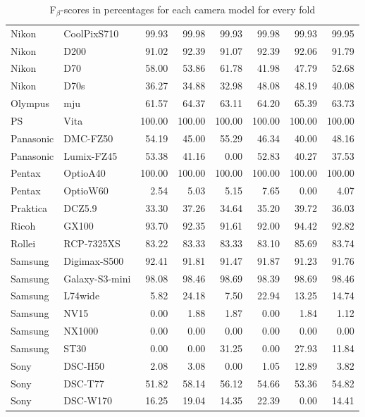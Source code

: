 \begin{table}[h]
{\begin{tabular}{|l|l|r|r|r|r|r|r|}
Nikon & CoolPixS710 & 99.93 & 99.98 & 99.93 & 99.98 & 99.93 & 99.95\\
Nikon & D200 & 91.02 & 92.39 & 91.07 & 92.39 & 92.06 & 91.79\\
Nikon & D70 & 58.00 & 53.86 & 61.78 & 41.98 & 47.79 & 52.68\\
Nikon & D70s & 36.27 & 34.88 & 32.98 & 48.08 & 48.19 & 40.08\\
Olympus & mju & 61.57 & 64.37 & 63.11 & 64.20 & 65.39 & 63.73\\
PS & Vita & 100.00 & 100.00 & 100.00 & 100.00 & 100.00 & 100.00\\
Panasonic & DMC-FZ50 & 54.19 & 45.00 & 55.29 & 46.34 & 40.00 & 48.16\\
Panasonic & Lumix-FZ45 & 53.38 & 41.16 & 0.00 & 52.83 & 40.27 & 37.53\\
Pentax & OptioA40 & 100.00 & 100.00 & 100.00 & 100.00 & 100.00 & 100.00\\
Pentax & OptioW60 & 2.54 & 5.03 & 5.15 & 7.65 & 0.00 & 4.07\\
Praktica & DCZ5.9 & 33.30 & 37.26 & 34.64 & 35.20 & 39.72 & 36.03\\
Ricoh & GX100 & 93.70 & 92.35 & 91.61 & 92.00 & 94.42 & 92.82\\
Rollei & RCP-7325XS & 83.22 & 83.33 & 83.33 & 83.10 & 85.69 & 83.74\\
Samsung & Digimax-S500 & 92.41 & 91.81 & 91.47 & 91.87 & 91.23 & 91.76\\
Samsung & Galaxy-S3-mini & 98.08 & 98.46 & 98.69 & 98.39 & 98.69 & 98.46\\
Samsung & L74wide & 5.82 & 24.18 & 7.50 & 22.94 & 13.25 & 14.74\\
Samsung & NV15 & 0.00 & 1.88 & 1.87 & 0.00 & 1.84 & 1.12\\
Samsung & NX1000 & 0.00 & 0.00 & 0.00 & 0.00 & 0.00 & 0.00\\
Samsung & ST30 & 0.00 & 0.00 & 31.25 & 0.00 & 27.93 & 11.84\\
Sony & DSC-H50 & 2.08 & 3.08 & 0.00 & 1.05 & 12.89 & 3.82\\
Sony & DSC-T77 & 51.82 & 58.14 & 56.12 & 54.66 & 53.36 & 54.82\\
Sony & DSC-W170 & 16.25 & 19.04 & 14.35 & 22.39 & 0.00 & 14.41\\
\hline
\end{tabular}
}
\caption{F$_\beta$-scores in percentages for each camera model for every fold}
\label{tab:fscore_everyclass_model}

\end{table}